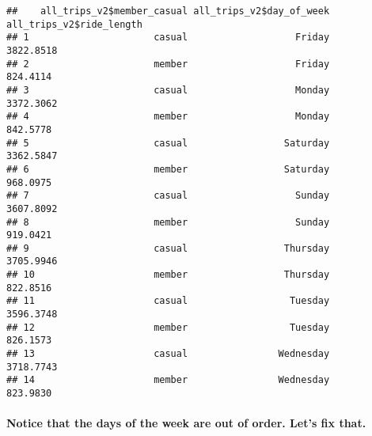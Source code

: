 \documentclass[
]{article}
\newenvironment{Shaded}{\begin{snugshade}}{\end{snugshade}}
\newcommand{\AttributeTok}[1]{\textcolor[rgb]{0.77,0.63,0.00}{#1}}
\newcommand{\FunctionTok}[1]{\textcolor[rgb]{0.00,0.00,0.00}{#1}}
\newcommand{\NormalTok}[1]{#1}
\newcommand{\OtherTok}[1]{\textcolor[rgb]{0.56,0.35,0.01}{#1}}
\newcommand{\SpecialCharTok}[1]{\textcolor[rgb]{0.00,0.00,0.00}{#1}}
\newcommand{\StringTok}[1]{\textcolor[rgb]{0.31,0.60,0.02}{#1}}
\begin{document}
\begin{verbatim}
##    all_trips_v2$member_casual all_trips_v2$day_of_week all_trips_v2$ride_length
## 1                      casual                   Friday                3822.8518
## 2                      member                   Friday                 824.4114
## 3                      casual                   Monday                3372.3062
## 4                      member                   Monday                 842.5778
## 5                      casual                 Saturday                3362.5847
## 6                      member                 Saturday                 968.0975
## 7                      casual                   Sunday                3607.8092
## 8                      member                   Sunday                 919.0421
## 9                      casual                 Thursday                3705.9946
## 10                     member                 Thursday                 822.8516
## 11                     casual                  Tuesday                3596.3748
## 12                     member                  Tuesday                 826.1573
## 13                     casual                Wednesday                3718.7743
## 14                     member                Wednesday                 823.9830
\end{verbatim}

\hypertarget{notice-that-the-days-of-the-week-are-out-of-order.-lets-fix-that.}{%
\paragraph{Notice that the days of the week are out of order. Let's fix
that.}\label{notice-that-the-days-of-the-week-are-out-of-order.-lets-fix-that.}}

\begin{Shaded}
\end{Shaded}
\end{document}
